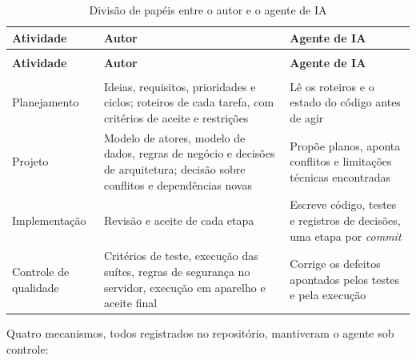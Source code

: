 \begin{quadrolongo}
\begin{longtable}{|>{\raggedright\arraybackslash}p{2.8cm}|>{\raggedright\arraybackslash}p{5.6cm}|>{\raggedright\arraybackslash}p{4.9cm}|}
  \caption{Divisão de papéis entre o autor e o agente de IA}\label{qua:papeis}\\
  \hline
  \textbf{Atividade} & \textbf{Autor} & \textbf{Agente de IA} \\ \hline
\endfirsthead
  \multicolumn{3}{r}{\textit{(continuação)}}\\
  \hline
  \textbf{Atividade} & \textbf{Autor} & \textbf{Agente de IA} \\ \hline
\endhead
  \multicolumn{3}{r}{\textit{(continua)}}\\
\endfoot
\endlastfoot
    Planejamento & Ideias, requisitos, prioridades e ciclos; roteiros de cada tarefa, com critérios de aceite e restrições & Lê os roteiros e o estado do código antes de agir \\ \hline
    Projeto & Modelo de atores, modelo de dados, regras de negócio e decisões de arquitetura; decisão sobre conflitos e dependências novas & Propõe planos, aponta conflitos e limitações técnicas encontradas \\ \hline
    Implementação & Revisão e aceite de cada etapa & Escreve código, testes e registros de decisões, uma etapa por \textit{commit} \\ \hline
    Controle de qualidade & Critérios de teste, execução das suítes, regras de segurança no servidor, execução em aparelho e aceite final & Corrige os defeitos apontados pelos testes e pela execução \\ \hline
\end{longtable}
\end{quadrolongo}

Quatro mecanismos, todos registrados no repositório, mantiveram o agente
sob controle:

